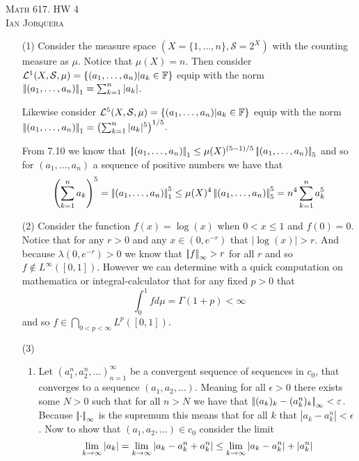 \documentclass[12pt]{amsart}
\begin{document}
\begin{center}
   \textsc{Math 617. HW 4\\ Ian Jorquera}
\end{center}
\vspace{1em}

\begin{itemize}
   \item[(1)] %
   Consider the measure space $(X=\{1,\dots,n\},\mathcal S=2^X)$ with the counting measure 
   as $\mu$. Notice that $\mu(X)=n$. Then consider $\mathcal L^1 (X,\mathcal S, \mu)=\{(a_1,\dots,a_n)|a_k\in \mathbb{F}\}$
   equip with the norm $\norm{(a_1,\dots,a_n)}_1=\sum_{k=1}^{n}|a_k|$.
   
   Likewise consider $\mathcal L^5 (X,\mathcal S, \mu)=\{(a_1,\dots,a_n)|a_k\in \mathbb{F}\}$ equip with the 
   norm $\norm{(a_1,\dots,a_n)}_1=\left(\sum_{k=1}^{n}|a_k|^5\right)^{1/5}$.

   From 7.10 we know that $\norm{(a_1,\dots,a_n)}_1\leq \mu(X)^{(5-1)/5}\norm{(a_1,\dots,a_n)}_5$ and so for 
   $(a_1,\dots,a_n)$ a sequence of positive numbers we have that
   \[\left(\sum_{k=1}^{n}a_k\right)^5=\norm{(a_1,\dots,a_n)}_1^5\leq \mu(X)^{4}\norm{(a_1,\dots,a_n)}_5^5=n^4\sum_{k=1}^{n}a_k^5\]


   \item[(2)] %
   Consider the function $f(x)=\log(x)$ when $0<x\leq 1$ and $f(0)=0$. Notice that for any $r>0$ and any $x\in(0,e^{-r})$ that $|\log(x)|>r$. 
   And because $\lambda(0,e^{-r})>0$ we know that $\norm{f}_\infty>r$ for all $r$ and so $f\not\in L^\infty([0,1])$.
   However we can determine with a quick computation on mathematica or integral-calculator that for any fixed $p>0$ that
   \[\int_{0}^1f d\mu=\Gamma(1+p)<\infty\]
   and so $f\in \bigcap_{0<p<\infty}L^p([0,1])$.
   \item[(3)]
   \begin{enumerate}[label=(\alph*)]
    \item %
    Let $(a^n_1,a^n_2,\dots)_{n=1}^{\infty}$ be a convergent sequence of sequences in $c_0$, that converges 
    to a sequence $(a_1,a_2,\dots)$. Meaning for all $\epsilon>0$ there exists some $N>0$ such that for all $n>N$ we have that
    $\norm{(a_k)_k-(a^n_k)_k}_\infty<\epsilon$. Because $\norm{\cdot}_\infty$ is the supremum this means that
    for all $k$ that $|a_k-a_k^n|<\epsilon$.
    Now to show that $(a_1,a_2,\dots)\in c_0$ consider the limit
    \[\lim_{k\rightarrow\infty}|a_k|=\lim_{k\rightarrow\infty}|a_k-a^n_k+a^n_k|\leq\lim_{k\rightarrow\infty}|a_k-a^n_k|+|a^n_k|\]


\end{enumerate}
\end{itemize}
\end{document}
